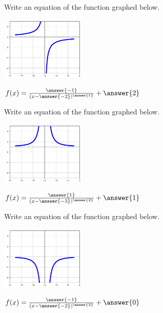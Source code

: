 \documentclass{ximera}
\begin{document}
\begin{question}
Write an equation of the function graphed below. 

	\begin{center}
	    \includegraphics[width = 0.3\textwidth]{graphRationalQ2.png}
	\end{center}

$f(x) = \frac{\answer{-1}}{(x - \answer{-2})^{\answer{1}}} + \answer{2}$
\end{question}

\begin{question}
Write an equation of the function graphed below. 

	\begin{center}
	    \includegraphics[width = 0.3\textwidth]{graphRationalQ3.png}
	\end{center}

$f(x) = \frac{\answer{1}}{(x - \answer{-3})^{\answer{2}}} + \answer{1}$
\end{question}

\begin{question}
Write an equation of the function graphed below. 

	\begin{center}
	    \includegraphics[width = 0.3\textwidth]{graphRationalQ4.png}
	\end{center}

$f(x) = \frac{\answer{-1}}{(x - \answer{-2})^{\answer{2}}} + \answer{0}$
\end{question}
\end{document}
